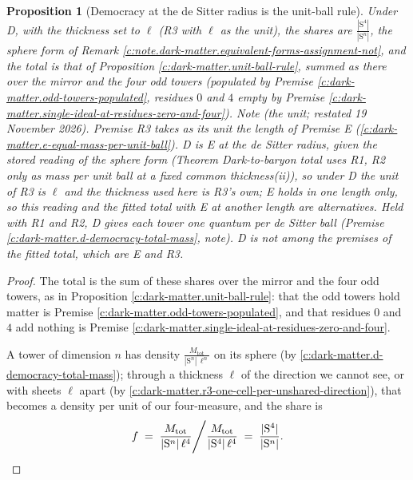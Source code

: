 \documentclass[11pt]{article}
\newtheorem{proposition}[theorem]{Proposition}
\theoremstyle{definition}
\theoremstyle{plain}
\newcommand{\changedmark}[2]{\marginpar{\raggedright\scriptsize\color{#1}#2}}
\providecommand{\Sph}{}\renewcommand{\Sph}{\mathrm{S}}
\begin{document}
\begin{proposition}[Democracy at the de Sitter radius is the unit-ball rule]\label{c:dark-matter.democracy-de-sitter-radius-unit-ball}
\changedmark{BurntOrange}{changed since the deposit}
Under D, with the thickness set to $\ell$ (R3 with $\ell$ as the unit), the shares are $\tfrac{|\Sph^{4}|}{|\Sph^{n}|}$, the sphere form of Remark \ref{c:note.dark-matter.equivalent-forms-assignment-not}, and the total is that of Proposition \ref{c:dark-matter.unit-ball-rule}, summed as there over the mirror and the four odd towers (populated by Premise \ref{c:dark-matter.odd-towers-populated}, residues $0$ and $4$ empty by Premise \ref{c:dark-matter.single-ideal-at-residues-zero-and-four}). \emph{Note (the unit; restated 19 November 2026).} Premise R3 takes as its unit the length of Premise E (\ref{c:dark-matter.e-equal-mass-per-unit-ball}). D is E at the de Sitter radius, given the stored reading of the sphere form (Theorem \emph{Dark-to-baryon total uses R1, R2 only as mass per unit ball at a fixed common thickness}(ii)), so under D the unit of R3 is $\ell$ and the thickness used here is R3's own; E holds in one length only, so this reading and the fitted total with E at another length are alternatives. Held with R1 and R2, D gives each tower one quantum per de Sitter ball (Premise \ref{c:dark-matter.d-democracy-total-mass}, note). D is not among the premises of the fitted total, which are E and R3.
\end{proposition}
\begin{proof}
The total is the sum of these shares over the mirror and the four odd towers, as in Proposition \ref{c:dark-matter.unit-ball-rule}: that the odd towers hold matter is Premise \ref{c:dark-matter.odd-towers-populated}, and that residues $0$ and $4$ add nothing is Premise \ref{c:dark-matter.single-ideal-at-residues-zero-and-four}.

A tower of dimension $n$ has density $\frac{M_{\mathrm{tot}}}{|\Sph^{n}|\,\ell^{n}}$ on its sphere (by \ref{c:dark-matter.d-democracy-total-mass}); through a thickness $\ell$ of the direction we cannot see, or with sheets $\ell$ apart (by \ref{c:dark-matter.r3-one-cell-per-unshared-direction}), that becomes a density per unit of our four-measure, and the share is
\[
f \;=\; \frac{M_{\mathrm{tot}}}{|\Sph^{n}|\,\ell^{4}} \Bigg/ \frac{M_{\mathrm{tot}}}{|\Sph^{4}|\,\ell^{4}} \;=\; \frac{|\Sph^{4}|}{|\Sph^{n}|} . \qedhere
\]

\end{proof}
\end{document}
